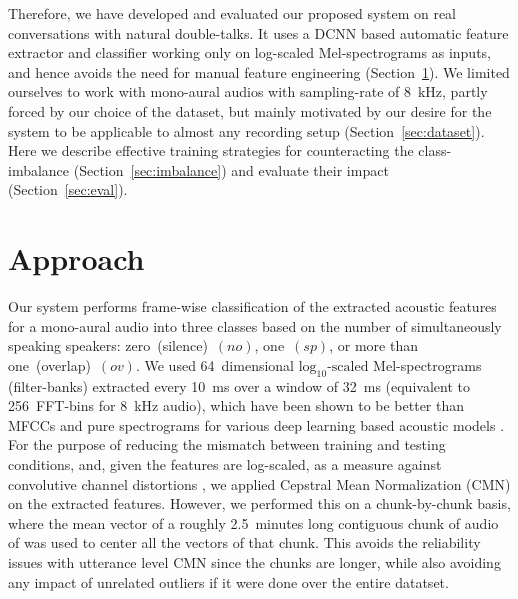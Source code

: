 \documentclass[a4paper]{article}
\begin{document}
Therefore, we have developed and evaluated our proposed system on real conversations with natural double-talks.
It uses a DCNN based automatic feature extractor and classifier working only on
log-scaled Mel-spectrograms as inputs,
and hence avoids the need for manual feature engineering
(Section~\ref{sec:approach}).
We limited ourselves to work with mono-aural audios with sampling-rate of 8~kHz,
partly forced by our choice of the dataset,
but mainly motivated by our desire for the system to be applicable to almost any recording setup
(Section~\ref{sec:dataset}).
Here we describe effective training strategies for counteracting the class-imbalance
(Section~\ref{sec:imbalance}) and evaluate their impact (Section~\ref{sec:eval}).

\section{Approach} \label{sec:approach}
Our system performs frame-wise classification of the extracted acoustic features for a mono-aural audio into three classes based on the number of simultaneously speaking speakers:
zero~(silence)~$(no)$, one~$(sp)$, or more than one~(overlap)~$(ov)$.
We used 64~dimensional $\text{log}_{10} \text{-scaled}$ Mel-spectrograms (filter-banks)
extracted every 10~ms over a window of 32~ms (equivalent to 256~FFT-bins for 8~kHz audio),
which have been shown to be better than MFCCs and pure spectrograms
for various deep learning based acoustic models \cite{deng_recent_2013}.
For the purpose of reducing the mismatch between training and testing conditions,
and, given the features are log-scaled, as a measure against convolutive channel distortions \cite{li_overview_2014},
we applied Cepstral Mean Normalization (CMN) on the extracted features.
However, we performed this on a chunk-by-chunk basis,
where the mean vector of a roughly 2.5~minutes long contiguous chunk of audio of was used to center all the vectors of that chunk.
This avoids the reliability issues with utterance level CMN \cite{prasad_improved_2013}
since the chunks are longer,
while also avoiding any impact of unrelated outliers if it were done over the entire datatset.
\end{document}
